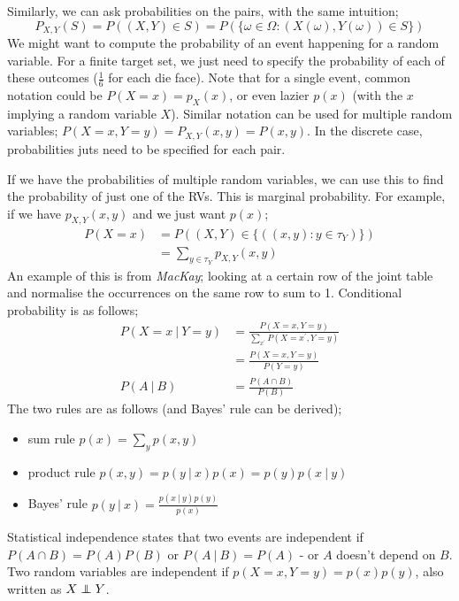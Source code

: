 \documentclass[a4paper, 12pt]{article}
\newcommand{\summation}[2]{\sum\limits_{#1}^{#2}}
\newcommand\independent{\protect\mathpalette{\protect\independenT}{\perp}}
\def\independenT#1#2{\mathrel{\rlap{$#1#2$}\mkern2mu{#1#2}}}
\begin{document}
                Similarly, we can ask probabilities on the pairs, with the same intuition;
                $$P_{X, Y}(S) = P((X, Y) \in S) = P(\{\omega \in \Omega : (X(\omega), Y(\omega)) \in S\})$$
                We might want to compute the probability of an event happening for a random variable.
                For a finite target set, we just need to specify the probability of each of these outcomes ($\frac{1}{6}$ for each die face).
                Note that for a single event, common notation could be $P(X = x) = p_X(x)$, or even lazier $p(x)$ (with the $x$ implying a random variable $X$).
                Similar notation can be used for multiple random variables; $P(X = x, Y = y) = P_{X, Y}(x, y) = P(x, y)$.
                In the discrete case, probabilities juts need to be specified for each pair.
                \medskip

                If we have the probabilities of multiple random variables, we can use this to find the probability of just one of the RVs.
                This is marginal probability.
                For example, if we have $p_{X, Y}(x, y)$ and we just want $p(x)$;
                \begin{align*}
                    P(X = x) & = P((X, Y) \in \{((x, y) : y \in \tau_Y)\}) \\
                    & = \summation{y \in \tau_Y}{} p_{X, Y}(x, y)
                \end{align*}
                An example of this is from \textit{MacKay}; looking at a certain row of the joint table and normalise the occurrences on the same row to sum to 1.
                Conditional probability is as follows;
                \begin{align*}
                    P(X = x\ |\ Y = y) & = \frac{P(X = x, Y = y)}{\summation{x^\prime}{} P(X = x^\prime, Y = y)}\\
                    & = \frac{P(X = x, Y = y)}{P(Y = y)} \\
                    P(A\ |\ B) & = \frac{P(A \cap B)}{P(B)}
                \end{align*}
                The two rules are as follows (and Bayes' rule can be derived);
                \begin{itemize}
                    \itemsep0em
                    \item sum rule \hfill $p(x) = \summation{y}{} p(x, y)$
                    \item product rule \hfill $p(x, y) = p(y\ |\ x)p(x) = p(y)p(x\ |\ y)$
                    \item Bayes' rule \hfill $p(y\ |\ x) = \frac{p(x\ |\ y)p(y)}{p(x)}$
                \end{itemize}
                Statistical independence states that two events are independent if $P(A \cap B) = P(A)P(B)$ or $P(A\ |\ B) = P(A)$ - or $A$ doesn't depend on $B$.
                Two random variables are independent if $p(X = x, Y = y) = p(x)p(y)$, also written as $X \independent Y$.
                \medskip
\end{document}
